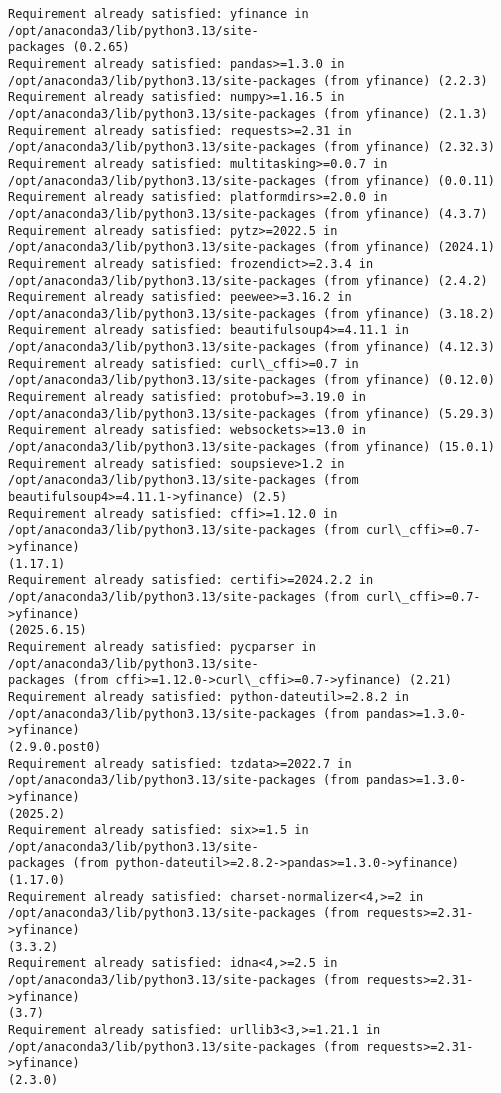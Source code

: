 \documentclass[11pt]{article}
\begin{document}
    \begin{Verbatim}[commandchars=\\\{\}]
Requirement already satisfied: yfinance in /opt/anaconda3/lib/python3.13/site-
packages (0.2.65)
Requirement already satisfied: pandas>=1.3.0 in
/opt/anaconda3/lib/python3.13/site-packages (from yfinance) (2.2.3)
Requirement already satisfied: numpy>=1.16.5 in
/opt/anaconda3/lib/python3.13/site-packages (from yfinance) (2.1.3)
Requirement already satisfied: requests>=2.31 in
/opt/anaconda3/lib/python3.13/site-packages (from yfinance) (2.32.3)
Requirement already satisfied: multitasking>=0.0.7 in
/opt/anaconda3/lib/python3.13/site-packages (from yfinance) (0.0.11)
Requirement already satisfied: platformdirs>=2.0.0 in
/opt/anaconda3/lib/python3.13/site-packages (from yfinance) (4.3.7)
Requirement already satisfied: pytz>=2022.5 in
/opt/anaconda3/lib/python3.13/site-packages (from yfinance) (2024.1)
Requirement already satisfied: frozendict>=2.3.4 in
/opt/anaconda3/lib/python3.13/site-packages (from yfinance) (2.4.2)
Requirement already satisfied: peewee>=3.16.2 in
/opt/anaconda3/lib/python3.13/site-packages (from yfinance) (3.18.2)
Requirement already satisfied: beautifulsoup4>=4.11.1 in
/opt/anaconda3/lib/python3.13/site-packages (from yfinance) (4.12.3)
Requirement already satisfied: curl\_cffi>=0.7 in
/opt/anaconda3/lib/python3.13/site-packages (from yfinance) (0.12.0)
Requirement already satisfied: protobuf>=3.19.0 in
/opt/anaconda3/lib/python3.13/site-packages (from yfinance) (5.29.3)
Requirement already satisfied: websockets>=13.0 in
/opt/anaconda3/lib/python3.13/site-packages (from yfinance) (15.0.1)
Requirement already satisfied: soupsieve>1.2 in
/opt/anaconda3/lib/python3.13/site-packages (from
beautifulsoup4>=4.11.1->yfinance) (2.5)
Requirement already satisfied: cffi>=1.12.0 in
/opt/anaconda3/lib/python3.13/site-packages (from curl\_cffi>=0.7->yfinance)
(1.17.1)
Requirement already satisfied: certifi>=2024.2.2 in
/opt/anaconda3/lib/python3.13/site-packages (from curl\_cffi>=0.7->yfinance)
(2025.6.15)
Requirement already satisfied: pycparser in /opt/anaconda3/lib/python3.13/site-
packages (from cffi>=1.12.0->curl\_cffi>=0.7->yfinance) (2.21)
Requirement already satisfied: python-dateutil>=2.8.2 in
/opt/anaconda3/lib/python3.13/site-packages (from pandas>=1.3.0->yfinance)
(2.9.0.post0)
Requirement already satisfied: tzdata>=2022.7 in
/opt/anaconda3/lib/python3.13/site-packages (from pandas>=1.3.0->yfinance)
(2025.2)
Requirement already satisfied: six>=1.5 in /opt/anaconda3/lib/python3.13/site-
packages (from python-dateutil>=2.8.2->pandas>=1.3.0->yfinance) (1.17.0)
Requirement already satisfied: charset-normalizer<4,>=2 in
/opt/anaconda3/lib/python3.13/site-packages (from requests>=2.31->yfinance)
(3.3.2)
Requirement already satisfied: idna<4,>=2.5 in
/opt/anaconda3/lib/python3.13/site-packages (from requests>=2.31->yfinance)
(3.7)
Requirement already satisfied: urllib3<3,>=1.21.1 in
/opt/anaconda3/lib/python3.13/site-packages (from requests>=2.31->yfinance)
(2.3.0)
    \end{Verbatim}
\end{document}
